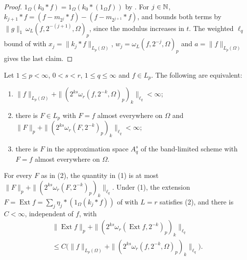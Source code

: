 \begin{proof}
\leanok
$1_\Omega (k_0 * f) = 1_\Omega (k_0 * (1_\Omega f))$ by . For
$j \in \mathbb{N}$, $k_{j+1} * f = (f - m_{2^j} * f) - (f - m_{2^{j+1}} * f)$, and 
bounds both terms by $\|g\|_1 \, \omega_L(f, 2^{-(j+1)}, \Omega)_p$, since the modulus
increases in $t$. The weighted $\ell_q$ bound of  with
$x_j = \|k_j * f\|_{L_p(\Omega)}$, $w_j = \omega_L(f, 2^{-j}, \Omega)_p$ and
$a = \|f\|_{L_p(\Omega)}$ gives the last claim.
\end{proof}

\begin{theorem}
\label{thm:graph-besov}
\leanok
{}
Let $1 \leq p < \infty$, $0 < s < r$, $1 \leq q \leq \infty$ and $f \in L_p$. The following are
equivalent:
\begin{enumerate}
  \item $\|f\|_{L_p(\Omega)} + \|(2^{ks} \omega_r(f, 2^{-k}, \Omega)_p)_k\|_{\ell_q} < \infty$;
  \item there is $F \in L_p$ with $F = f$ almost everywhere on $\Omega$ and
    $\|F\|_p + \|(2^{ks} \omega_r(F, 2^{-k})_p)_k\|_{\ell_q} < \infty$;
  \item there is $F$ in the approximation space $A^s_q$ of the band-limited scheme with
    $F = f$ almost everywhere on $\Omega$.
\end{enumerate}
For every $F$ as in (2), the quantity in (1) is at most
$\|F\|_p + \|(2^{ks} \omega_r(F, 2^{-k})_p)_k\|_{\ell_q}$. Under (1), the extension
$F = \operatorname{Ext} f = \sum_j \eta_j * (1_\Omega (k_j * f))$ of 
with $L = r$ satisfies (2), and there is $C < \infty$, independent of $f$, with
\begin{multline*}
  \|\operatorname{Ext} f\|_p + \|(2^{ks} \omega_r(\operatorname{Ext} f, 2^{-k})_p)_k\|_{\ell_q} \\
  \leq C \bigl( \|f\|_{L_p(\Omega)} + \|(2^{ks} \omega_r(f, 2^{-k}, \Omega)_p)_k\|_{\ell_q}
  \bigr) .
\end{multline*}
\end{theorem}

